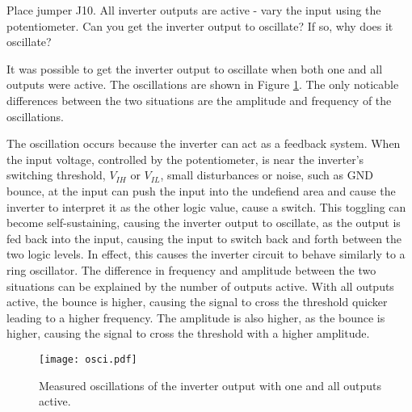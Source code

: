 \documentclass[../main.tex]{subfiles}
\begin{document}
\vspace{10pt}

Place jumper J10. All inverter outputs are active - vary the input using the potentiometer. Can you get the inverter output to oscillate? If so, why does it oscillate?

\solution

It was possible to get the inverter output to oscillate when both one and all outputs were active. The oscillations are shown in Figure \ref{fig:inverter_oscillation}. The only noticable differences between the two situations are the amplitude and frequency of the oscillations.

The oscillation occurs because the inverter can act as a feedback system. When the input voltage, controlled by the potentiometer, is near the inverter's switching threshold, $V_{IH}$ or $V_{IL}$, small disturbances or noise, such as GND bounce, at the input can push the input into the undefiend area and cause the inverter to interpret it as the other logic value, cause a switch. This toggling can become self-sustaining, causing the inverter output to oscillate, as the output is fed back into the input, causing the input to switch back and forth between the two logic levels. In effect, this causes the inverter circuit to behave similarly to a ring oscillator. The difference in frequency and amplitude between the two situations can be explained by the number of outputs active. With all outputs active, the bounce is higher, causing the signal to cross the threshold quicker leading to a higher frequency. The amplitude is also higher, as the bounce is higher, causing the signal to cross the threshold with a higher amplitude.

\begin{figure}[h]
    \centering
    \texttt{[image: osci.pdf]}
    \caption{Measured oscillations of the inverter output with one and all outputs active.}
    \label{fig:inverter_oscillation}
\end{figure}
\end{document}
